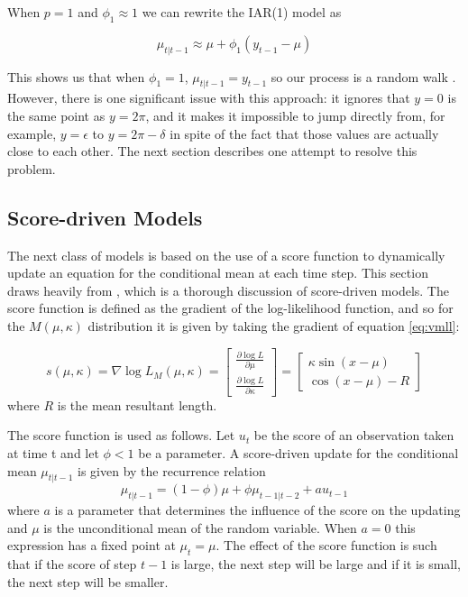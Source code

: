 \documentclass[11pt]{article}
\numberwithin{equation}{section}
\numberwithin{figure}{section}
\begin{document}
When $p=1$ and $\phi_1 \approx 1$ we can rewrite the IAR(1) model as

\begin{equation}\label{eq:IAR1}
\mu_{t|t-1} \approx \mu+\phi_1(y_{t-1}-\mu)
\end{equation}

This shows us that when $\phi_1 = 1$, $\mu_{t|t-1} = y_{t-1}$ so our process is a random walk \cite{Harvey}. However, there is one significant issue with this approach: it ignores that $y=0$ is the same point as $y=2\pi$, and it makes it impossible to jump directly from, for example, $y=\epsilon$ to $y=2\pi-\delta$ in spite of the fact that those values are actually close to each other. The next section describes one attempt to resolve this problem.

\subsection{Score-driven Models}

The next class of models is based on the use of a score function to dynamically update an equation for the conditional mean at each time step. This section draws heavily from \cite{Harvey}, which is a thorough discussion of score-driven models. The score function is defined as the gradient of the log-likelihood function, and so for the $M(\mu, \kappa)$ distribution it is given by taking the gradient of equation \ref{eq:vmll}:

\begin{equation}\label{eq:vmscore}
s(\mu,\kappa) = \nabla \log{L_M(\mu, \kappa) } = \begin{bmatrix} \frac{\partial \log L}{\partial \mu} \\ \frac{\partial \log L}{\partial \kappa}  \end{bmatrix}
=\begin{bmatrix} \kappa \sin(x-\mu ) \\ \cos(x-\mu)-R \end{bmatrix}
\end{equation}
where $R$ is the mean resultant length. 

The score function is used as follows. Let $u_t$ be the score of an observation taken at time t and let $\phi<1$ be a parameter. A score-driven update for the conditional mean $\mu_{t|t-1} $ is given by the recurrence relation
\begin{equation}\label{eq:score update}
\mu_{t|t-1} = (1-\phi)\mu+\phi \mu_{t-1|t-2}+a u_{t-1}
\end{equation}
where $a$ is a parameter that determines the influence of the score on the updating and $\mu$ is the unconditional mean of the random variable. When $a=0$ this expression has a fixed point at $\mu_t = \mu$. The effect of the score function is such that if the score of step $t-1$ is large, the next step will be large and if it is small, the next step will be smaller. 
\end{document}
